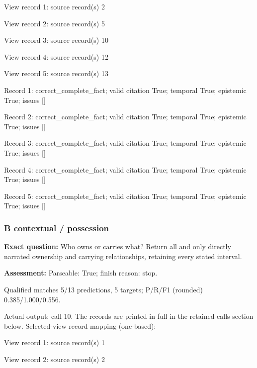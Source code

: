 View record 1: source record(s) 2\par

View record 2: source record(s) 5\par

View record 3: source record(s) 10\par

View record 4: source record(s) 12\par

View record 5: source record(s) 13\par

Record 1: correct\_complete\_fact; valid citation True; temporal True; epistemic True; issues []\par

Record 2: correct\_complete\_fact; valid citation True; temporal True; epistemic True; issues []\par

Record 3: correct\_complete\_fact; valid citation True; temporal True; epistemic True; issues []\par

Record 4: correct\_complete\_fact; valid citation True; temporal True; epistemic True; issues []\par

Record 5: correct\_complete\_fact; valid citation True; temporal True; epistemic True; issues []\par

\subsubsection*{B contextual / possession}

\noindent\textbf{Exact question:} Who owns or carries what? Return all and only directly narrated ownership and carrying relationships, retaining every stated interval.\par

\noindent\textbf{Assessment:} Parseable: True; finish reason: stop.

Qualified matches 5/13 predictions, 5 targets; P/R/F1 (rounded) 0.385/1.000/0.556.\par

Actual output: call 10. The records are printed in full in the retained-calls section below. Selected-view record mapping (one-based):

View record 1: source record(s) 1\par

View record 2: source record(s) 2\par

